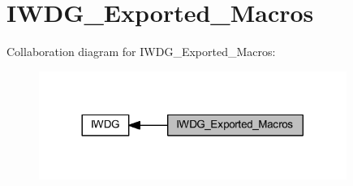 \hypertarget{group___i_w_d_g___exported___macros}{}\section{I\+W\+D\+G\+\_\+\+Exported\+\_\+\+Macros}
\label{group___i_w_d_g___exported___macros}
Collaboration diagram for I\+W\+D\+G\+\_\+\+Exported\+\_\+\+Macros\+:
\nopagebreak
\begin{figure}[H]
\begin{center}
\leavevmode
\includegraphics[width=284pt]{group___i_w_d_g___exported___macros}
\end{center}
\end{figure}
